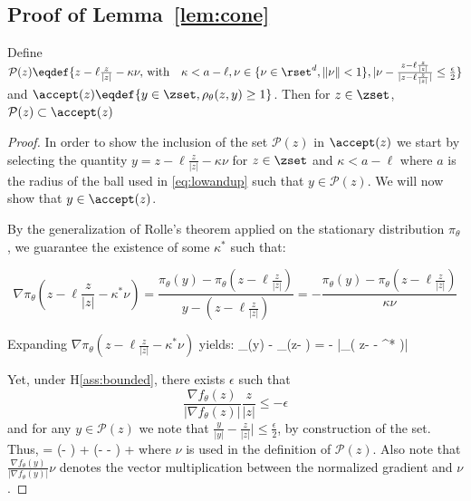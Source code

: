 \documentclass[10pt,twocolumn,letterpaper]{article}
\begin{document}
\subsection{Proof of Lemma~\ref{lem:cone}}

\begin{Lemma*}
Define $\mathcal{P}(z) \eqdef \{ z- \ell \frac{z}{|z|} - \kappa \nu , \, \textrm{with} \quad \kappa < a - \ell  , \nu \in \{ \nu \in \rset^d, \| \nu \| < 1\}, |\nu - \frac{z- \ell \frac{z}{|z|} }{|z- \ell \frac{z}{|z|} |} \leq \frac{\epsilon}{2}   \}$ and $\accept(z) \eqdef \{ y \in \zset, \rho_\theta(z,y) \geq 1 \}$. Then for $z \in \zset$, $\mathcal{P}(z) \subset \accept(z)$
\end{Lemma*}

\begin{proof}

In order to show the inclusion of the set $\mathcal{P}(z)$ in $\accept(z)$ we start by selecting the quantity $y = z- \ell \frac{z}{|z|} - \kappa \nu$ for $z\in \zset$ and $\kappa < a - \ell $ where $a$ is the radius of the ball used in \eqref{eq:lowandup} such that $y \in \mathcal{P}(z)$.
We will now show that $y \in \accept(z)$.

By the generalization of Rolle's theorem applied on the stationary distribution $\pi_\theta$, we guarantee the existence of some $\kappa^*$ such that:

$$
\nabla \pi_\theta( z- \ell \frac{z}{|z|} - \kappa^* \nu) = \frac{\pi_\theta(y) - \pi_\theta(z- \ell \frac{z}{|z|})}{y - (z- \ell \frac{z}{|z|})} = - \frac{\pi_\theta(y) - \pi_\theta(z- \ell \frac{z}{|z|})}{\kappa \nu}
$$

Expanding $\nabla \pi_\theta( z- \ell \frac{z}{|z|} - \kappa^* \nu)$ yields:
\beq\label{eq:interlem}
\pi_\theta(y) - \pi_\theta(z- \ell {}) = - \kappa \nu {} |\nabla \pi_\theta( z- \ell {} - \kappa^* \nu)|
\eeq

Yet, under H\ref{ass:bounded}, there exists $\epsilon$ such that 
$$
 \frac{\nabla f_{\theta}(z) }{|\nabla f_{\theta}(z) |}  \frac{z }{|z|} \leq -\epsilon
 $$
 and for any $y \in \mathcal{P}(z)$ we note that $\frac{y }{|y|} - \frac{z }{|z|}|\leq \frac{\epsilon}{2}$, by construction of the set.
 Thus, 
\beq\label{eq:finallem}
    \nu  =   (\nu - ) +   (\nu -  -  ) +    
\eeq
 where $\nu$ is used in the definition of $\mathcal{P}(z)$.
 Also note that $  \frac{\nabla f_{\theta}(y) }{|\nabla f_{\theta}(y) |}  \nu  $ denotes the vector multiplication between the normalized gradient and $\nu$.
 

\end{proof}
\end{document}
